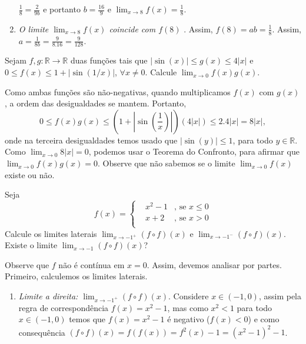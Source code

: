 \documentclass[11pt]{exam}
\begin{document}
\begin{questions}
\begin{solution}
\begin{enumerate}
        $\frac{1}{8}=\frac{2}{9b}$ e portanto 
        $b=\frac{16}{9}$ e $\lim_{x \rightarrow 8} f(x)=\frac{1}{8}$.
        \item {\it  O limite $\lim_{x \rightarrow 8} f(x)$ coincide com $f(8)$ }. Assim, $f(8)=ab=\frac{1}{8}$. Assim, $a=\frac{1}{8b}=\frac{9}{8.16}=\frac{9}{128}$. 
        \end{enumerate}
      \end{solution}
    \question[15] Sejam  
    $f,g:\mathbb{R}\rightarrow \mathbb{R}$ duas funções 
    tais que $|\sin(x)|\leq g(x)\leq 4|x|$ e 
    $0 \leq f(x)\leq 1+|\sin(1/x)|$,  $\forall x \neq 0$. 
    Calcule $\lim_{x \rightarrow 0} f(x)g(x)$.
       \begin{solution}
       Como ambas funções são não-negativas, quando multiplicamos 
       $f(x)$ com $g(x)$, a ordem das desigualdades se mantem. Portanto, 
       $$0 \leq f(x)g(x) \leq (1+|\sin(\frac{1}{x})|)(4|x|)\leq 2. 4|x|=8 |x|, $$
       onde na terceira desigualdades temos usado que $|\sin(y)|\leq 1$, 
       para todo $y \in \mathbb{R}$.
       Como $\lim_{x \rightarrow 0} 8|x|=0$, podemos usar o Teorema do Confronto, para afirmar que  $\lim_{x \rightarrow 0} f(x)g(x)=0$. Observe que não sabemos se o limite $\lim_{x \rightarrow 0} f(x)$ existe ou não.       
       \end{solution}
    \question [15] Seja 
     $$
    f(x)= \left\{  
            \begin{array}{lll}
    &x^{2}-1& \text{, se } x \leq 0 \\
    &x+2    &\text{, se } x>0\\
            \end{array}
            \right. 
    $$
    Calcule os limites laterais 
    $\lim_{x \rightarrow -1^{+}} (f \circ f)(x)$
    e $\lim_{x \rightarrow -1^{-}} (f \circ f)(x)$. Existe o limite $\lim_{x \rightarrow -1} (f \circ f)(x)$?
       \begin{solution}
       Observe que $f$ não é contínua em $x=0$. Assim, devemos analisar por partes. Primeiro, calculemos os limites laterais. 
         \begin{enumerate}
         \item {\it Limite a direita: 
         $\lim_{x \rightarrow -1^{+}} (f \circ f)(x)$}. Considere 
         $x \in (-1, 0)$, assim pela regra de correspondência 
         $f(x)=x^{2}-1$, mas como $x^{2}<1$ para todo $x \in (-1, 0)$
         temos que 
         $f(x)=x^{2}-1$ é negativo ($f(x)<0$) e como consequência 
         $(f \circ f)(x)=f(f(x))=f^{2}(x)-1=(x^{2}-1)^{2}-1$.

\end{enumerate}
\end{solution}
\end{questions}
\end{document}
